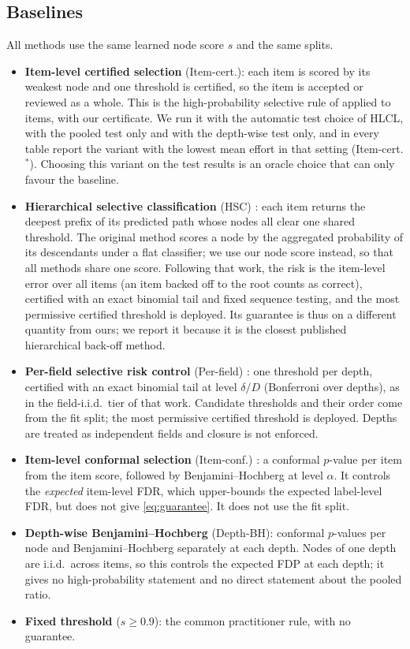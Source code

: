 \documentclass[preprint,12pt]{elsarticle}
\theoremstyle{definition}
\theoremstyle{remark}
\newcommand{\hlcl}{\textup{\textsc{HLCL}}}
\begin{document}
\subsection{Baselines}
\label{sec:exp-base}

All methods use the same learned node score $s$ and the same splits.
\begin{itemize}
  \item \textbf{Item-level certified selection} (Item-cert.): each item is
  scored by its weakest node and one threshold is certified, so the item is
  accepted or reviewed as a whole. This is the high-probability selective rule
  of \cite{geifman2017selective} applied to items, with our certificate. We run
  it with the automatic test choice of \hlcl{}, with the pooled test only and
  with the depth-wise test only, and in every table report the variant with the
  lowest mean effort in that setting (Item-cert.$^\ast$). Choosing this variant
  on the test results is an oracle choice that can only favour the baseline.
  \item \textbf{Hierarchical selective classification} (HSC)
  \cite{goren2024hierarchical}: each item returns the deepest prefix of its
  predicted path whose nodes all clear one shared threshold. The original method
  scores a node by the aggregated probability of its descendants under a
  flat classifier; we use our node score instead, so that all methods share
  one score. Following that
  work, the risk is the item-level error over all items (an item backed off to
  the root counts as correct), certified with an exact binomial tail and fixed
  sequence testing, and the most permissive certified threshold is deployed.
  Its guarantee is thus on a different quantity from ours; we report it because
  it is the closest published hierarchical back-off method.
  \item \textbf{Per-field selective risk control} (Per-field)
  \cite{perfield2026}: one threshold per depth, certified with an exact binomial
  tail at level $\delta/D$ (Bonferroni over depths), as in the field-i.i.d.\
  tier of that work. Candidate thresholds and their order come from the fit
  split; the most permissive certified threshold is deployed. Depths are treated
  as independent fields and closure is not enforced.
  \item \textbf{Item-level conformal selection} (Item-conf.)
  \cite{huang2025selective,jin2023selection}: a conformal $p$-value per item from
  the item score, followed by Benjamini--Hochberg at level $\alpha$. It controls
  the \emph{expected} item-level FDR, which upper-bounds the expected label-level
  FDR, but does not give \eqref{eq:guarantee}. It does not use the fit split.
  \item \textbf{Depth-wise Benjamini--Hochberg} (Depth-BH): conformal $p$-values
  per node and Benjamini--Hochberg separately at each depth. Nodes of one depth
  are i.i.d.\ across items, so this controls the expected FDP at each depth; it
  gives no high-probability statement and no direct statement about the pooled
  ratio.
  \item \textbf{Fixed threshold} ($s\ge0.9$): the common practitioner rule, with
  no guarantee.
\end{itemize}
\end{document}
